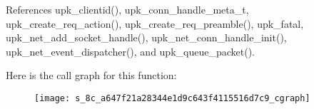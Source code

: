 References upk\_\-clientid(), upk\_\-conn\_\-handle\_\-meta\_\-t, upk\_\-create\_\-req\_\-action(), upk\_\-create\_\-req\_\-preamble(), upk\_\-fatal, upk\_\-net\_\-add\_\-socket\_\-handle(), upk\_\-net\_\-conn\_\-handle\_\-init(), upk\_\-net\_\-event\_\-dispatcher(), and upk\_\-queue\_\-packet().



Here is the call graph for this function:
\nopagebreak
\begin{figure}[H]
\begin{center}
\leavevmode
\texttt{[image: s\_8c\_a647f21a28344e1d9c643f4115516d7c9\_cgraph]}
\end{center}
\end{figure}


